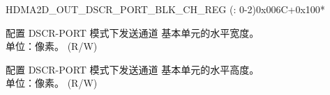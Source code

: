 \begin{register}{H}{DMA2D\_OUT\_DSCR\_PORT\_BLK\_CH\_REG (: 0-2)}{0x006C+0x100*}\label{regdesc:DMA2DOUTDSCRPORTBLKCHNREG}
%
%
%
\regnewline%
\begin{regdesc}\begin{reglist}
\label{fielddesc:DMA2DOUTDSCRPORTBLKHCHN}\item [DMA2D\_OUT\_DSCR\_PORT\_BLK\_H\_CH\regindex{n}] 配置 DSCR-PORT 模式下发送通道  基本单元的水平宽度。\\单位：像素。 (R/W)
\label{fielddesc:DMA2DOUTDSCRPORTBLKVCHN}\item [DMA2D\_OUT\_DSCR\_PORT\_BLK\_V\_CH\regindex{n}] 配置 DSCR-PORT 模式下发送通道  基本单元的水平高度。\\单位：像素。 (R/W)
\end{reglist}\end{regdesc}
\end{register}


